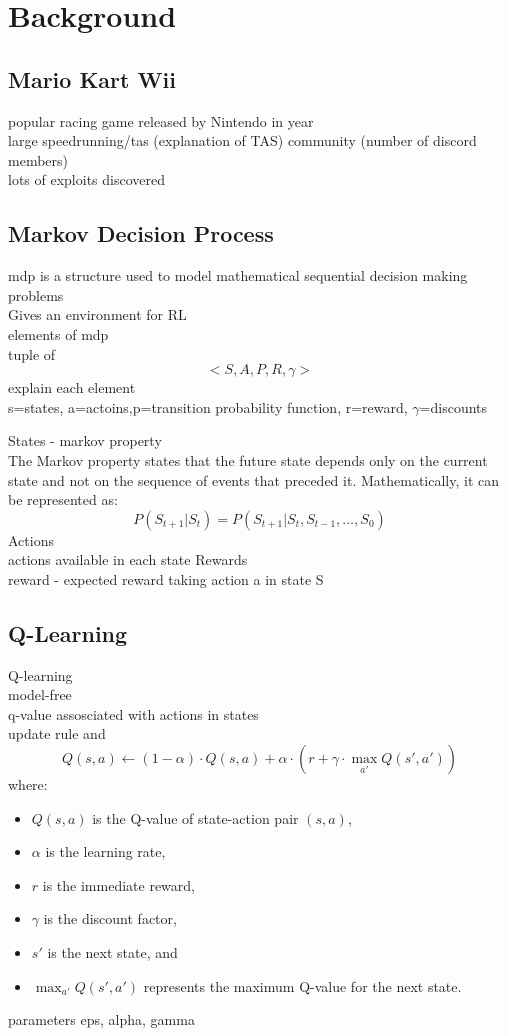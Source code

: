 
\chapter{Background}
\section{Mario Kart Wii}
popular racing game released by Nintendo in year \\ large speedrunning/tas (explanation of TAS) community (number of discord members) \\ lots of exploits discovered

\section{Markov Decision Process}
mdp is a structure used to model mathematical sequential decision making problems\\
Gives an environment for RL\\
elements of mdp\\ tuple of
\[ <S, A, P, R, \gamma>\]
explain each element\\ s=states, a=actoins,p=transition probability function, r=reward, $\gamma$=discounts

States - markov property\\
The Markov property states that the future state depends only on the current state and not on the sequence of events that preceded it. Mathematically, it can be represented as:
\[
P(S_{t+1} | S_t) = P(S_{t+1} | S_t, S_{t-1}, \ldots, S_0)
\]
Actions\\
actions available in each state
Rewards\\
reward - expected reward taking action a in state S

\section{Q-Learning}
\cite{watkins1992q} Q-learning \\
model-free\\
q-value assosciated with actions in states\\
update rule and 
\[
Q(s, a) \leftarrow (1 - \alpha) \cdot Q(s, a) + \alpha \cdot \left( r + \gamma \cdot \max_{a'} Q(s', a') \right)
\]
where:
\begin{itemize}
    \item $Q(s, a)$ is the Q-value of state-action pair $(s, a)$,
    \item $\alpha$ is the learning rate,
    \item $r$ is the immediate reward,
    \item $\gamma$ is the discount factor,
    \item $s'$ is the next state, and
    \item $\max_{a'} Q(s', a')$ represents the maximum Q-value for the next state.
\end{itemize}
parameters eps, alpha, gamma

